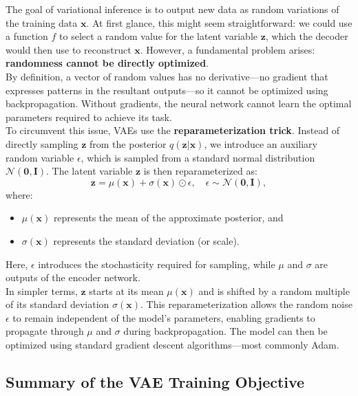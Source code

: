 \documentclass[a4paper,12pt]{article}
\begin{document}
The goal of variational inference is to output new data as random variations of the training data $\mathbf{x}$. At first glance, this might seem straightforward: we could use a function $f$ to select a random value for the latent variable $\mathbf{z}$, which the decoder would then use to reconstruct $\mathbf{x}$. However, a fundamental problem arises: \textbf{randomness cannot be directly optimized}. \\

By definition, a vector of random values has no derivative—no gradient that expresses patterns in the resultant outputs—so it cannot be optimized using backpropagation. Without gradients, the neural network cannot learn the optimal parameters required to achieve its task. \\

To circumvent this issue, VAEs use the \textbf{reparameterization trick}. Instead of directly sampling $\mathbf{z}$ from the posterior $q(\mathbf{z}|\mathbf{x})$, we introduce an auxiliary random variable $\epsilon$, which is sampled from a standard normal distribution $\mathcal{N}(\mathbf{0}, \mathbf{I})$. The latent variable $\mathbf{z}$ is then reparameterized as:
\[
\mathbf{z} = \mu(\mathbf{x}) + \sigma(\mathbf{x}) \odot \epsilon, \quad \epsilon \sim \mathcal{N}(\mathbf{0}, \mathbf{I}),
\]
where:
\begin{itemize}
    \item $\mu(\mathbf{x})$ represents the mean of the approximate posterior, and  
    \item $\sigma(\mathbf{x})$ represents the standard deviation (or scale).  
\end{itemize} 

Here, $\epsilon$ introduces the stochasticity required for sampling, while $\mu$ and $\sigma$ are outputs of the encoder network. \\

In simpler terms, $\mathbf{z}$ starts at its mean $\mu(\mathbf{x})$ and is shifted by a random multiple of its standard deviation $\sigma(\mathbf{x})$. This reparameterization allows the random noise $\epsilon$ to remain independent of the model’s parameters, enabling gradients to propagate through $\mu$ and $\sigma$ during backpropagation. The model can then be optimized using standard gradient descent algorithms—most commonly Adam.

\subsection{Summary of the VAE Training Objective}
\end{document}
